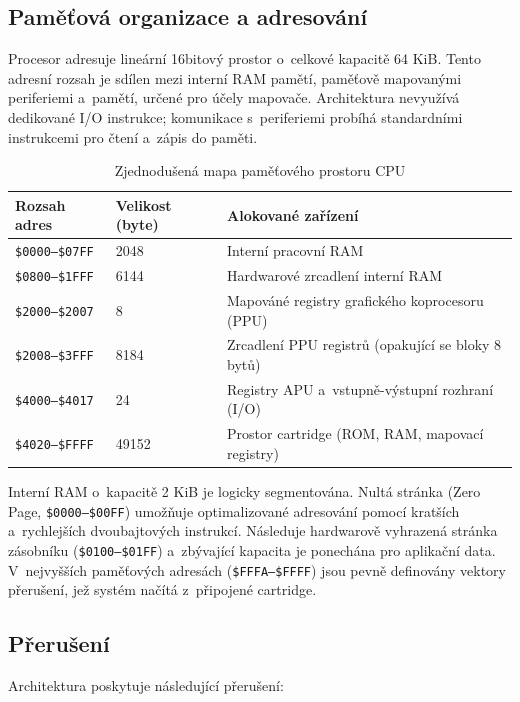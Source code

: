 \subsection{Paměťová organizace a adresování}

Procesor adresuje lineární 16bitový prostor o~celkové kapacitě 64 KiB. Tento adresní rozsah je
sdílen mezi interní RAM pamětí, paměťově mapovanými periferiemi a~pamětí, určené pro účely mapovače.
Architektura nevyužívá dedikované I/O instrukce; komunikace s~periferiemi probíhá standardními
instrukcemi pro čtení a~zápis do paměti.

\begin{table}[htbp]
    \centering
    \begin{tabular}{lll}
    \toprule
    Rozsah adres & Velikost (byte) & Alokované zařízení \\
    \midrule
    \texttt{\$0000–\$07FF} & 2048 & Interní pracovní RAM \\
    \texttt{\$0800–\$1FFF} & 6144 & Hardwarové zrcadlení interní RAM \\
    \texttt{\$2000–\$2007} & 8 & Mapováné registry grafického koprocesoru (PPU) \\
    \texttt{\$2008–\$3FFF} & 8184 & Zrcadlení PPU registrů (opakující se bloky 8 bytů) \\
    \texttt{\$4000–\$4017} & 24 & Registry APU a~vstupně-výstupní rozhraní (I/O) \\
    \texttt{\$4020–\$FFFF} & 49152 & Prostor cartridge (ROM, RAM, mapovací registry) \\
    \bottomrule
    \end{tabular}
    \caption{Zjednodušená mapa paměťového prostoru CPU}
\end{table}

Interní RAM o~kapacitě 2 KiB je logicky segmentována. Nultá stránka (Zero Page,
\texttt{\$0000–\$00FF}) umožňuje optimalizované adresování pomocí kratších a~rychlejších
dvoubajtových instrukcí. Následuje hardwarově vyhrazená stránka zásobníku (\texttt{\$0100–\$01FF})
a~zbývající kapacita je ponechána pro aplikační data. V~nejvyšších paměťových adresách
(\texttt{\$FFFA–\$FFFF}) jsou pevně definovány vektory přerušení, jež systém načítá z~připojené
cartridge.

\subsection{Přerušení}

Architektura poskytuje následující přerušení:

